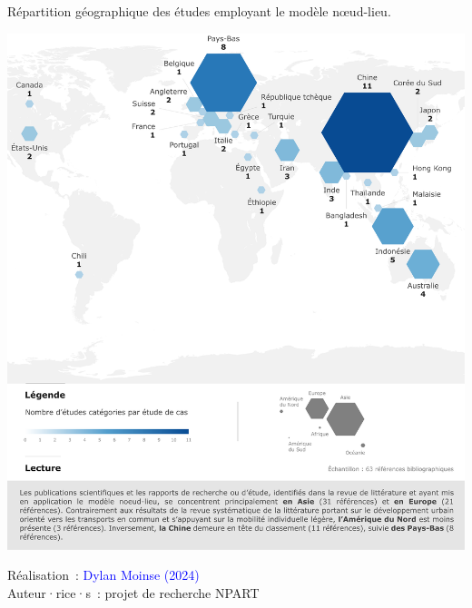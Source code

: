 \begin{refsegment}
    \begin{carte}[h!]\vspace*{4pt}
        \caption{Répartition géographique des études employant le modèle nœud-lieu.}
        \label{fig-chap6:repartition-geographique}
        \centerline{\includegraphics[width=1\columnwidth]{src/Figures/Chap-6/FR_NPART_Repartition_geographique.pdf}}
        \vspace{5pt}
        \begin{flushright}\scriptsize{
        Réalisation~: \textcolor{blue}{Dylan Moinse (2024)}
        \\
        Auteur·rice·s~: projet de recherche \acrshort{NPART}
        }\end{flushright}
    \end{carte}


\end{refsegment}
